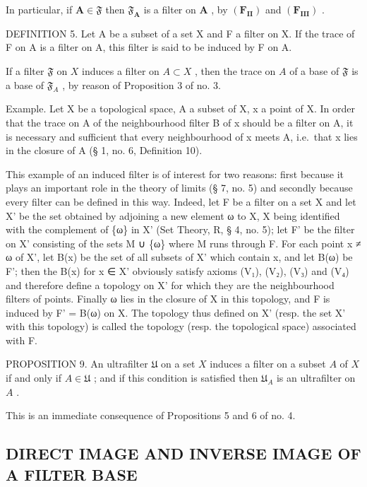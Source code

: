 In particular, if \(\mathbf{A} \in \mathfrak{F}\) then \(\mathfrak{F}_{\mathbf{A}}\) is a filter on \(\mathbf{A}\) , by \((\mathbf{F}_{\mathbf{II}})\) and \((\mathbf{F}_{\mathbf{III}})\) .

DEFINITION 5. Let A be a subset of a set X and F a filter on X. If the trace of F on A is a filter on A, this filter is said to be induced by F on A.

If a filter \(\mathfrak{F}\) on \(X\) induces a filter on \(A \subset X\) , then the trace on \(A\) of a base of \(\mathfrak{F}\) is a base of \(\mathfrak{F}_A\) , by reason of Proposition 3 of no. 3.

Example. Let X be a topological space, A a subset of X, x a point of X. In order that the trace on A of the neighbourhood filter B of x should be a filter on A, it is necessary and sufficient that every neighbourhood of x meets A, i.e.~that x lies in the closure of A (§ 1, no. 6, Definition 10).

This example of an induced filter is of interest for two reasons: first because it plays an important role in the theory of limits (§ 7, no. 5) and secondly because every filter can be defined in this way. Indeed, let F be a filter on a set X and let X' be the set obtained by adjoining a new element ω to X, X being identified with the complement of \{ω\} in X' (Set Theory, R, § 4, no. 5); let F' be the filter on X' consisting of the sets M ∪ \{ω\} where M runs through F. For each point x ≠ ω of X', let B(x) be the set of all subsets of X' which contain x, and let B(ω) be F'; then the B(x) for x ∈ X' obviously satisfy axioms (V₁), (V₂), (V₃) and (V₄) and therefore define a topology on X' for which they are the neighbourhood filters of points. Finally ω lies in the closure of X in this topology, and F is induced by F' = B(ω) on X. The topology thus defined on X' (resp. the set X' with this topology) is called the topology (resp. the topological space) associated with F.

PROPOSITION 9. An ultrafilter \(\mathfrak{U}\) on a set \(X\) induces a filter on a subset \(A\) of \(X\) if and only if \(A \in \mathfrak{U}\) ; and if this condition is satisfied then \(\mathfrak{U}_A\) is an ultrafilter on \(A\) .

This is an immediate consequence of Propositions 5 and 6 of no. 4.

\subsection{DIRECT IMAGE AND INVERSE IMAGE OF A FILTER BASE}

